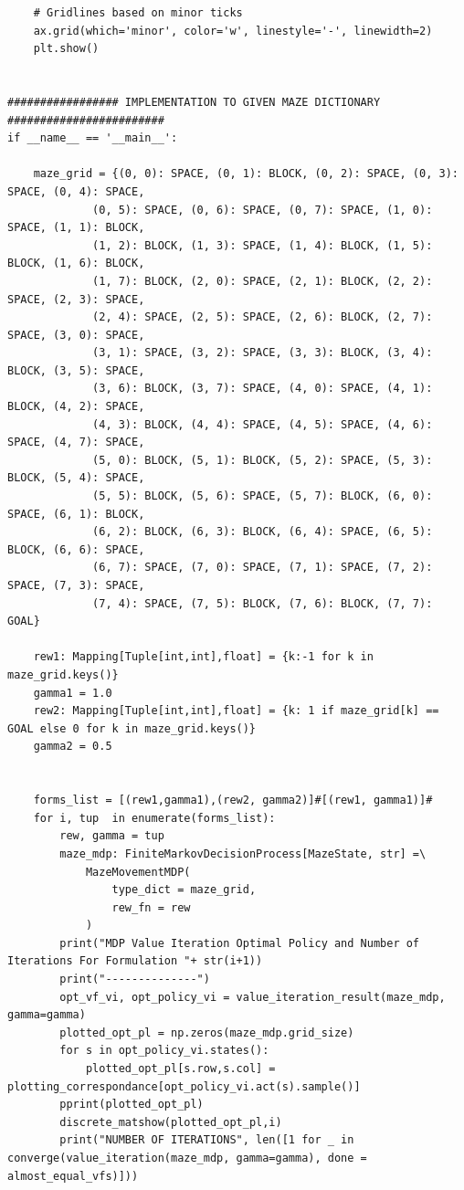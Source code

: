\documentclass{article}[12pt]
\begin{document}
\begin{lstlisting}
    # Gridlines based on minor ticks
    ax.grid(which='minor', color='w', linestyle='-', linewidth=2)
    plt.show()


################# IMPLEMENTATION TO GIVEN MAZE DICTIONARY ########################
if __name__ == '__main__':

    maze_grid = {(0, 0): SPACE, (0, 1): BLOCK, (0, 2): SPACE, (0, 3): SPACE, (0, 4): SPACE, 
             (0, 5): SPACE, (0, 6): SPACE, (0, 7): SPACE, (1, 0): SPACE, (1, 1): BLOCK,
             (1, 2): BLOCK, (1, 3): SPACE, (1, 4): BLOCK, (1, 5): BLOCK, (1, 6): BLOCK, 
             (1, 7): BLOCK, (2, 0): SPACE, (2, 1): BLOCK, (2, 2): SPACE, (2, 3): SPACE, 
             (2, 4): SPACE, (2, 5): SPACE, (2, 6): BLOCK, (2, 7): SPACE, (3, 0): SPACE, 
             (3, 1): SPACE, (3, 2): SPACE, (3, 3): BLOCK, (3, 4): BLOCK, (3, 5): SPACE, 
             (3, 6): BLOCK, (3, 7): SPACE, (4, 0): SPACE, (4, 1): BLOCK, (4, 2): SPACE, 
             (4, 3): BLOCK, (4, 4): SPACE, (4, 5): SPACE, (4, 6): SPACE, (4, 7): SPACE, 
             (5, 0): BLOCK, (5, 1): BLOCK, (5, 2): SPACE, (5, 3): BLOCK, (5, 4): SPACE, 
             (5, 5): BLOCK, (5, 6): SPACE, (5, 7): BLOCK, (6, 0): SPACE, (6, 1): BLOCK, 
             (6, 2): BLOCK, (6, 3): BLOCK, (6, 4): SPACE, (6, 5): BLOCK, (6, 6): SPACE, 
             (6, 7): SPACE, (7, 0): SPACE, (7, 1): SPACE, (7, 2): SPACE, (7, 3): SPACE, 
             (7, 4): SPACE, (7, 5): BLOCK, (7, 6): BLOCK, (7, 7): GOAL}

    rew1: Mapping[Tuple[int,int],float] = {k:-1 for k in maze_grid.keys()}
    gamma1 = 1.0
    rew2: Mapping[Tuple[int,int],float] = {k: 1 if maze_grid[k] == GOAL else 0 for k in maze_grid.keys()}
    gamma2 = 0.5


    forms_list = [(rew1,gamma1),(rew2, gamma2)]#[(rew1, gamma1)]#
    for i, tup  in enumerate(forms_list):
        rew, gamma = tup
        maze_mdp: FiniteMarkovDecisionProcess[MazeState, str] =\
            MazeMovementMDP(
                type_dict = maze_grid,
                rew_fn = rew
            )
        print("MDP Value Iteration Optimal Policy and Number of Iterations For Formulation "+ str(i+1))
        print("--------------")
        opt_vf_vi, opt_policy_vi = value_iteration_result(maze_mdp, gamma=gamma)
        plotted_opt_pl = np.zeros(maze_mdp.grid_size)
        for s in opt_policy_vi.states():
            plotted_opt_pl[s.row,s.col] = plotting_correspondance[opt_policy_vi.act(s).sample()]
        pprint(plotted_opt_pl)
        discrete_matshow(plotted_opt_pl,i)
        print("NUMBER OF ITERATIONS", len([1 for _ in converge(value_iteration(maze_mdp, gamma=gamma), done = almost_equal_vfs)]))
    \end{lstlisting}
\end{document}
